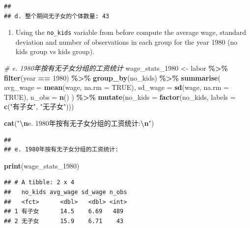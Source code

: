 \documentclass[
]{article}
\newenvironment{Shaded}{\begin{snugshade}}{\end{snugshade}}
\newcommand{\AttributeTok}[1]{\textcolor[rgb]{0.13,0.29,0.53}{#1}}
\newcommand{\CommentTok}[1]{\textcolor[rgb]{0.56,0.35,0.01}{\textit{#1}}}
\newcommand{\ConstantTok}[1]{\textcolor[rgb]{0.56,0.35,0.01}{#1}}
\newcommand{\DecValTok}[1]{\textcolor[rgb]{0.00,0.00,0.81}{#1}}
\newcommand{\FunctionTok}[1]{\textcolor[rgb]{0.13,0.29,0.53}{\textbf{#1}}}
\newcommand{\NormalTok}[1]{#1}
\newcommand{\OtherTok}[1]{\textcolor[rgb]{0.56,0.35,0.01}{#1}}
\newcommand{\SpecialCharTok}[1]{\textcolor[rgb]{0.81,0.36,0.00}{\textbf{#1}}}
\newcommand{\StringTok}[1]{\textcolor[rgb]{0.31,0.60,0.02}{#1}}
\providecommand{\tightlist}{%
  \setlength{\itemsep}{0pt}\setlength{\parskip}{0pt}}
\begin{document}
\begin{verbatim}
## 
## d. 整个期间无子女的个体数量: 43
\end{verbatim}

\begin{enumerate}
\def\labelenumi{\alph{enumi}.}
\setcounter{enumi}{4}
\tightlist
\item
  Using the \texttt{no\_kids} variable from before compute the average
  wage, standard deviation and number of observations in each group for
  the year 1980 (no kids group vs kids group).
\end{enumerate}

\begin{Shaded}
\begin{Highlighting}[]
\CommentTok{\# e. 1980年按有无子女分组的工资统计}
\NormalTok{wage\_stats\_1980 }\OtherTok{\textless{}{-}}\NormalTok{ labor }\SpecialCharTok{\%\textgreater{}\%}
  \FunctionTok{filter}\NormalTok{(year }\SpecialCharTok{==} \DecValTok{1980}\NormalTok{) }\SpecialCharTok{\%\textgreater{}\%}
  \FunctionTok{group\_by}\NormalTok{(no\_kids) }\SpecialCharTok{\%\textgreater{}\%}
  \FunctionTok{summarise}\NormalTok{(}
    \AttributeTok{avg\_wage =} \FunctionTok{mean}\NormalTok{(wage, }\AttributeTok{na.rm =} \ConstantTok{TRUE}\NormalTok{),}
    \AttributeTok{sd\_wage =} \FunctionTok{sd}\NormalTok{(wage, }\AttributeTok{na.rm =} \ConstantTok{TRUE}\NormalTok{),}
    \AttributeTok{n\_obs =} \FunctionTok{n}\NormalTok{()}
\NormalTok{  ) }\SpecialCharTok{\%\textgreater{}\%}
  \FunctionTok{mutate}\NormalTok{(}\AttributeTok{no\_kids =} \FunctionTok{factor}\NormalTok{(no\_kids, }\AttributeTok{labels =} \FunctionTok{c}\NormalTok{(}\StringTok{"有子女"}\NormalTok{, }\StringTok{"无子女"}\NormalTok{)))}

\FunctionTok{cat}\NormalTok{(}\StringTok{"}\SpecialCharTok{\textbackslash{}n}\StringTok{e. 1980年按有无子女分组的工资统计:}\SpecialCharTok{\textbackslash{}n}\StringTok{"}\NormalTok{)}
\end{Highlighting}
\end{Shaded}

\begin{verbatim}
## 
## e. 1980年按有无子女分组的工资统计:
\end{verbatim}

\begin{Shaded}
\begin{Highlighting}[]
\FunctionTok{print}\NormalTok{(wage\_stats\_1980)}
\end{Highlighting}
\end{Shaded}

\begin{verbatim}
## # A tibble: 2 x 4
##   no_kids avg_wage sd_wage n_obs
##   <fct>      <dbl>   <dbl> <int>
## 1 有子女      14.5    6.69   489
## 2 无子女      15.9    6.71    43
\end{verbatim}
\end{document}
